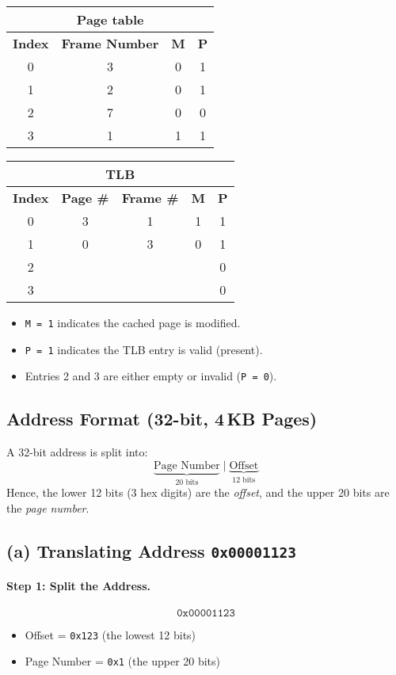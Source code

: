 \documentclass{article}
\begin{document}
\begin{tabular}{|c|c|c|c|}
  \hline
  \multicolumn{4}{|c|}{{\bf Page table}} \\
\hline
\textbf{Index} & \textbf{Frame Number} & \textbf{M} & \textbf{P} \\
\hline
0 & 3 & 0 & 1 \\
1 & 2 & 0 & 1 \\
2 & 7 & 0 & 0 \\
3 & 1 & 1 & 1 \\
\hline
\end{tabular}
\begin{tabular}{|c|c|c|c|c|}
  \hline
  \multicolumn{5}{|c|}{{\bf TLB}} \\
\hline
\textbf{Index} & \textbf{Page \#} & \textbf{Frame \#} & \textbf{M} & \textbf{P} \\
\hline
0 & 3 & 1 & 1 & 1 \\
1 & 0 & 3 & 0 & 1 \\
2 &   &   &   & 0 \\
3 &   &   &   & 0 \\
\hline
\end{tabular}
\begin{itemize}
  \item \texttt{M = 1} indicates the cached page is modified.
  \item \texttt{P = 1} indicates the TLB entry is valid (present).
  \item Entries 2 and 3 are either empty or invalid (\texttt{P = 0}).
\end{itemize}

\subsection*{Address Format (32-bit, 4\,KB Pages)}

A 32-bit address is split into:
\[
\underbrace{\text{Page Number}}_{20 \text{ bits}}
\;\big\vert\;
\underbrace{\text{Offset}}_{12 \text{ bits}}
\]
Hence, the lower 12 bits (3 hex digits) are the \emph{offset}, and the upper 20 bits are the \emph{page number}.

\newpage




\subsection*{(a) Translating Address \texttt{0x00001123}}

\paragraph{Step 1: Split the Address.}
\[
\texttt{0x00001123}
\]
\begin{itemize}
  \item Offset = \texttt{0x123} (the lowest 12 bits)
  \item Page Number = \texttt{0x1} (the upper 20 bits)
\end{itemize}
\end{document}
